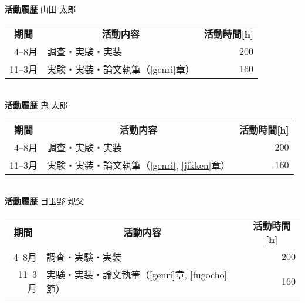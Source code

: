 
\thispagestyle{empty}

\begin{table}[tbp]
\large
\centering

\textbf{活動履歴} 山田 太郎\\
\begin{tabular}{rlr}
\hline
\multicolumn{1}{c}{\textbf{期間}}&
\multicolumn{1}{c}{\textbf{活動内容}}&
\multicolumn{1}{c}{\textbf{活動時間[h]}}
\\
4--8月 & 調査・実験・実装 & 200 \\
11--3月 & 実験・実装・論文執筆（\ref{genri}章） & 160\\
\hline
\end{tabular}\\
\vspace{2in}
\textbf{活動履歴} 鬼 太郎\\
\begin{tabular}{rlr}
\hline
\multicolumn{1}{c}{\textbf{期間}}&
\multicolumn{1}{c}{\textbf{活動内容}}&
\multicolumn{1}{c}{\textbf{活動時間[h]}}
\\
4--8月 & 調査・実験・実装 & 200 \\
11--3月 & 実験・実装・論文執筆（\ref{genri}, \ref{jikken}章） & 160\\
\hline
\end{tabular}\\
\vspace{2in}
\textbf{活動履歴} 目玉野 親父\\
\begin{tabular}{rlr}
\hline
\multicolumn{1}{c}{\textbf{期間}}&
\multicolumn{1}{c}{\textbf{活動内容}}&
\multicolumn{1}{c}{\textbf{活動時間[h]}}
\\
4--8月 & 調査・実験・実装 & 200 \\
11--3月 & 実験・実装・論文執筆（\ref{genri}章, \ref{fugocho}節） & 160\\
\hline
\end{tabular}\\
\vspace{2in}
\end{table}
\clearpage

